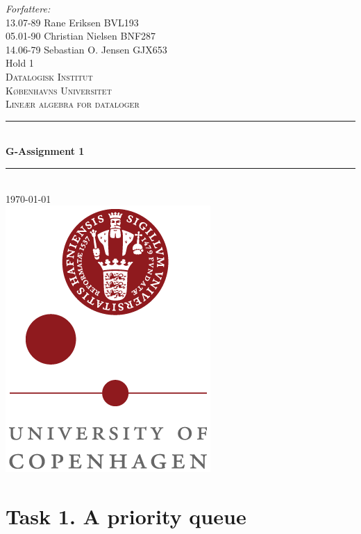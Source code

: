 \documentclass[a4paper,12pt,danish]{report}
\begin{document}
\begin{titlepage}

\newcommand{\HRule}{\rule{\linewidth}{0.4mm}}
\center
\small{ \emph{Forfattere:}\\
13.07-89 Rane Eriksen \textsc{BVL193}
\\
05.01-90 Christian Nielsen \textsc{BNF287}
\\
14.06-79 Sebastian O. Jensen \textsc{GJX653}
\\
Hold 1} \\[2cm]

\textsc{\LARGE Datalogisk Institut}\\[0.5cm]
\textsc{\large Københavns Universitet}\\[1.5cm]
\textsc{\large Lineær algebra for dataloger}\\
\HRule \\[0.7cm]
{\huge \bfseries G-Assignment 1}\\[0.4cm]
\HRule \\[1.5cm]
\textsc{\Large \textsc{\today}}\\[0.5cm]

\includegraphics[scale=0.5]{ku_logo.png}\\[1cm]

\end{titlepage}
\tableofcontents
\newpage
\renewcommand{\thesection}{\arabic{section}}
\renewcommand{\thempfootnote}{\arabic{mpfootnote}}
\renewcommand\thesubsection{}
\newcommand{\minus}[1]{{#1}^{-}}
\section{Task 1. A priority queue}
\end{document}
